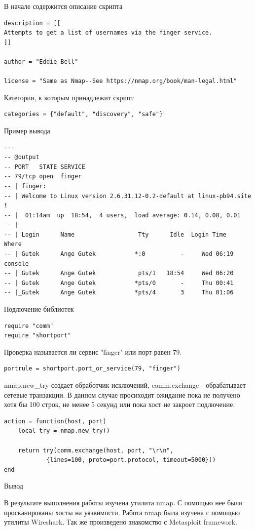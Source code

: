 \documentclass[10pt,a4paper]{article}
\begin{document}
В начале содержится описание скрипта

\begin{verbatim}
description = [[
Attempts to get a list of usernames via the finger service.
]]

author = "Eddie Bell"

license = "Same as Nmap--See https://nmap.org/book/man-legal.html"
\end{verbatim}

Категории, к которым принадлежит скрипт

\begin{verbatim}
categories = {"default", "discovery", "safe"}
\end{verbatim}

Пример вывода

\begin{verbatim}
---
-- @output
-- PORT   STATE SERVICE
-- 79/tcp open  finger
-- | finger:
-- | Welcome to Linux version 2.6.31.12-0.2-default at linux-pb94.site !
-- |  01:14am  up  18:54,  4 users,  load average: 0.14, 0.08, 0.01
-- |
-- | Login      Name                  Tty      Idle  Login Time   Where
-- | Gutek      Ange Gutek           *:0          -     Wed 06:19 console
-- | Gutek      Ange Gutek            pts/1   18:54     Wed 06:20
-- | Gutek      Ange Gutek           *pts/0       -     Thu 00:41
-- |_Gutek      Ange Gutek           *pts/4       3     Thu 01:06
\end{verbatim}

Подлючение библиотек

\begin{verbatim}
require "comm"
require "shortport"
\end{verbatim}

Проверка называется ли сервис "finger" или порт равен 79. 
\begin{verbatim}
portrule = shortport.port_or_service(79, "finger")
\end{verbatim}

nmap.new\_try создает обработчик исключений, comm.exchange - обрабатывает сетевые транзакции. В данном случае просиходит ожидание пока не получено хотя бы 100 строк, не менее 5 секунд или пока хост не закроет подлючение.

\begin{verbatim}
action = function(host, port)
	local try = nmap.new_try()

	return try(comm.exchange(host, port, "\r\n",
        	{lines=100, proto=port.protocol, timeout=5000}))
end
\end{verbatim}

\newpage

\caption{Вывод}

В результате выполнения работы изучена утилита nmap. С помощью нее были просканированы хосты на уязвимости. Работа nmap была изучена с помощью утилиты Wireshark. Так же произведено знакомство с Metasploit framework.

\end{document}
